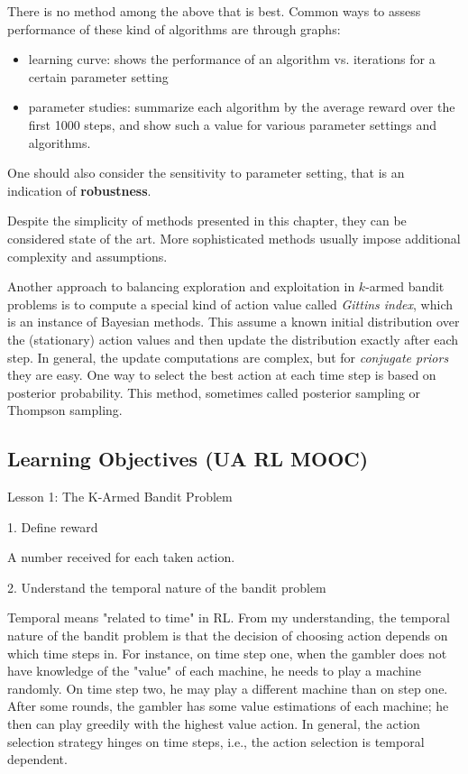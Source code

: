 \documentclass[sutton_barto_notes.tex]{subfiles}
\begin{document}
There is no method among the above that is best. Common ways to assess performance of these kind of algorithms are through graphs:
\begin{itemize}
\item learning curve: shows the performance of an algorithm vs. iterations for a certain parameter setting
\item parameter studies: summarize each algorithm by the average reward over the first 1000 steps, and show such a value for various parameter settings and algorithms.
\end{itemize}

One should also consider the sensitivity to parameter setting, that is an indication of \textbf{robustness}.

Despite the simplicity of methods presented in this chapter, they can be considered state of the art. More sophisticated methods usually impose additional complexity and assumptions.

Another approach to balancing exploration and exploitation in $k$-armed bandit problems is to compute a special kind of action value called \textit{Gittins index}, which is an instance of Bayesian methods. This assume a known initial distribution over the (stationary) action values and then update the distribution exactly after each step.
In general, the update computations are complex, but for \textit{conjugate priors} they are easy.
One way to select the best action at each time step is based on posterior probability.
This method, sometimes called posterior sampling or Thompson sampling.

\newpage
\subsection{Learning Objectives (UA RL MOOC)}

Lesson 1: The K-Armed Bandit Problem

1. Define reward

A number received for each taken action.

2. Understand the temporal nature of the bandit problem

Temporal means "related to time" in RL. From my understanding, the temporal nature of the bandit problem is that the decision of choosing action depends on which time steps in.
For instance, on time step one, when the gambler does not have knowledge of the "value" of each machine, he needs to play a machine randomly. On time step two, he may play a different machine than on step one. After some rounds, the gambler has some value estimations of each machine; he then can play greedily with the highest value action.
In general, the action selection strategy hinges on time steps, i.e., the action selection is temporal dependent.
\end{document}
